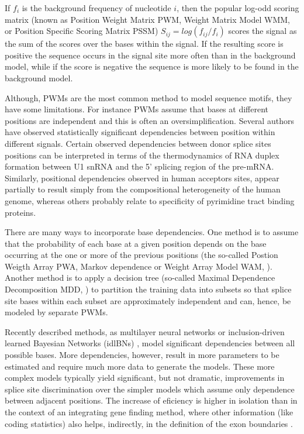 


If $f_i$ is the background frequency of nucleotide $i$, then the
popular log-odd scoring matrix (known as Position Weight Matrix PWM,
Weight Matrix Model WMM, or Position Specific Scoring Matrix PSSM)
$S_{ij}=log(f_{ij}/f_i)$ scores the signal as the sum of the scores
over the bases within the signal. If the resulting score is positive
the sequence occurs in the signal site more often than in the background
model, while if the score is negative the sequence is more likely to
be found in the background model.

Although, PWMs are the most common method to model sequence motifs,
they have some limitations. For instance PWMs assume that bases at
different positions are independent and this is often an
oversimplification.  Several authors have observed statistically
significant dependencies between position within different
signals. Certain observed dependencies between donor splice sites
positions can be interpreted in terms of the thermodynamics of RNA
duplex formation between U1 snRNA and the 5' splicing region of the
pre-mRNA. Similarly, positional dependencies observed in human
acceptors sites, appear partially to result simply from the
compositional heterogeneity of the human genome, whereas others
probably relate to specificity of pyrimidine tract binding proteins.

There are many ways to incorporate base dependencies. One method is to
assume that the probability of each base at a given position depends
on the base occurring at the one or more of the previous positions
(the so-called Postion Weigth Array PWA, Markov dependence or Weight
Array Model WAM, \cite{zhang:1993a}).  Another method is to apply a
decision tree (so-called Maximal Dependence Decomposition MDD,
\cite{burge:1997a}) to partition the training data into subsets so
that splice site bases within each subset are approximately
independent and can, hence, be modeled by separate PWMs.

Recently described methods, as multilayer neural networks
\citep{reese:1997a} or inclusion-driven learned Bayesian Networks
(idlBNs) \citep{castelo:2004a}, model significant dependencies between
all possible bases. More dependencies, however, result in more
parameters to be estimated and require much more data to generate the
models. These more complex models typically yield significant, but not
dramatic, improvements in splice site discrimination over the simpler
models which assume only dependence between adjacent positions. The
increase of eficiency is higher in isolation than in the context of
an integrating gene finding method, where other information (like
coding statistics) also helps, indirectly, in the definition of the
exon boundaries
\citep{burge:1998a}.

